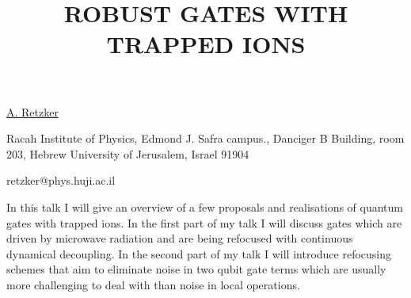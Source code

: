 \title{ROBUST GATES WITH TRAPPED IONS}

\underline{A. Retzker} 

{\normalsize{\vspace{-4mm}
Racah Institute of Physics,
Edmond J. Safra campus.,
Danciger B Building, room 203,
Hebrew University of Jerusalem,
Israel 91904

\email retzker@phys.huji.ac.il}}

In this talk I will give an overview of a few proposals and realisations of quantum gates with trapped ions.
In the first part of my talk I will discuss gates which are driven by microwave radiation and are being refocused with
continuous dynamical decoupling. In the second part of my talk I will introduce refocusing schemes that aim to eliminate
noise in two qubit gate terms which are usually more challenging to deal with than noise in local operations.


%
%
%



\vspace{\baselineskip} 